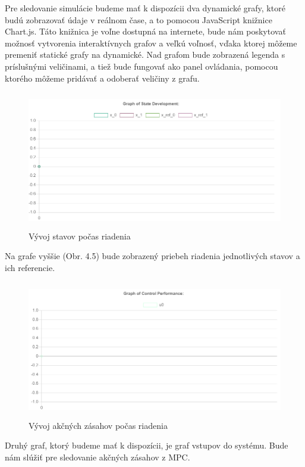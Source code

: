 Pre sledovanie simulácie budeme mať k dispozícii dva dynamické grafy, ktoré budú zobrazovať údaje v reálnom čase, a to pomocou JavaScript knižnice Chart.js. Táto knižnica je voľne dostupná na internete, bude nám poskytovať možnosť vytvorenia interaktívnych grafov a veľkú voľnosť, vďaka ktorej môžeme premeniť statické grafy na dynamické. Nad grafom bude zobrazená legenda s príslušnými veličinami, a tiež bude fungovať ako panel ovládania, pomocou ktorého môžeme pridávať a odoberať veličiny z grafu. 
\begin{figure}[H]
	\centering
	\includegraphics[width=13cm,height=6cm]{images/graf_stavov}
	\caption{Vývoj stavov počas riadenia}
\end{figure}
Na grafe vyššie (Obr. 4.5) bude zobrazený priebeh riadenia jednotlivých stavov a ich referencie.
\begin{figure}[H]	
	\centering
	\includegraphics[width=13cm,height=6cm]{images/graf_vstupov}
	\caption{Vývoj akčných zásahov počas riadenia}
\end{figure}
Druhý graf, ktorý budeme mať k dispozícii, je graf vstupov do systému. Bude nám slúžiť pre sledovanie akčných zásahov z MPC.

